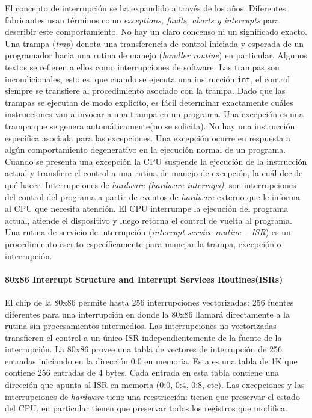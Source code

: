El concepto de interrupción se ha expandido a través de los años. Diferentes fabricantes usan términos como \textit{exceptions, faults, aborts \textnormal{y} interrupts} para describir este comportamiento. No hay un claro concenso ni un significado exacto.
Una trampa (\textit{trap}) denota una transferencia de control iniciada y esperada de un programador hacia una rutina de manejo (\textit{handler routine}) en particular. Algunos textos se refieren a ellos como interrupciones de software. Las trampas son incondicionales, esto es, que cuando se ejecuta una instrucción \texttt{int}, el control siempre se transfiere al procedimiento asociado con la trampa. Dado que las trampas se ejecutan de modo explicíto, es fácil determinar exactamente cuáles instrucciones van a invocar a una trampa en un programa. Una excepción es una trampa que se genera automáticamente(no se solicita). No hay una instrucción específica asociada para las excepciones. Una excepción ocurre en respuesta a algún comportamiento degenerativo en la ejecución normal de un programa. Cuando se presenta una excepción la CPU suspende la ejecución de la instrucción actual y transfiere el control a una rutina de manejo de excepción, la cuál decide qué hacer. Interrupciones de \textit{hardware} \textit{(hardware interrups)}, son interrupciones del control del programa a partir de eventos de \textit{hardware} externo que le informa al CPU que necesita atención. El CPU interrumpe la ejecución del programa actual, atiende el dispositivo y luego retorna el control de vuelta al programa. Una rutina de servicio de interrupción (\textit{interrupt service routine -- ISR}) es un procedimiento escrito específicamente para manejar la trampa, excepción o interrupción.

\paragraph{\textnormal{\textbf{80x86 Interrupt Structure and Interrupt Services Routines(ISRs)}}}
El chip de la 80x86 permite hasta 256 interrupciones vectorizadas: 256 fuentes diferentes para una interrupción en donde la 80x86 llamará directamente a la rutina sin procesamientos intermedios. Las interrupciones no-vectorizadas transfieren el control a un único ISR independientemente de la fuente de la interrupción. La 80x86 provee una tabla de vectores de interrupción de 256 entradas iniciando en la dirección 0:0 en memoria. Esta es una tabla de 1K que contiene 256 entradas de 4 bytes. Cada entrada en esta tabla contiene una dirección que apunta al ISR en memoria (0:0, 0:4, 0:8, etc). Las excepciones y las interrupciones de \textit{hardware} tiene una reestricción: tienen que preservar el estado del CPU, en particular tienen que preservar todos los registros que modifica.

